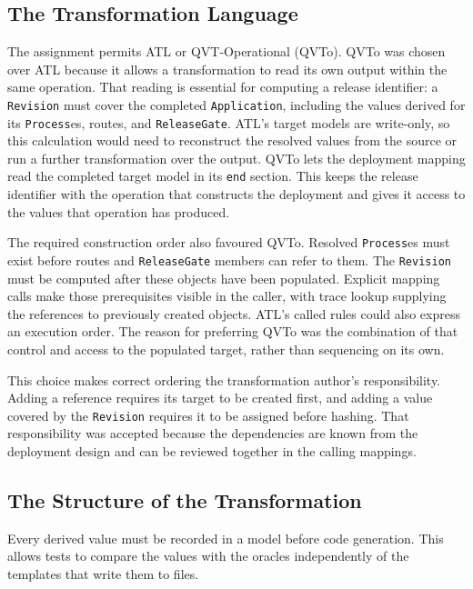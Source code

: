 \subsection{The Transformation Language}
\label{sec:language}

The assignment permits ATL or QVT-Operational (QVTo). QVTo was chosen over ATL because it allows a transformation to read its own output within the same operation. That reading is essential for computing a release identifier: a \texttt{Revision} must cover the completed \texttt{Application}, including the values derived for its \texttt{Process}es, routes, and \texttt{ReleaseGate}. ATL's target models are write-only, so this calculation would need to reconstruct the resolved values from the source or run a further transformation over the output.
QVTo lets the deployment mapping read the completed target model in its
\texttt{end} section. This keeps the release identifier with the operation
that constructs the deployment and gives it access to the values that
operation has produced.

The required construction order also favoured QVTo. Resolved
\texttt{Process}es must exist before routes and \texttt{ReleaseGate}
members can refer to them. The \texttt{Revision} must be computed after
these objects have been populated. Explicit mapping calls make those
prerequisites visible in the caller, with trace lookup supplying the
references to previously created objects. ATL's called rules could also
express an execution order. The reason for preferring QVTo was the
combination of that control and access to the populated target, rather
than sequencing on its own.

This choice makes correct ordering the transformation author's
responsibility. Adding a reference requires its target to be created
first, and adding a value covered by the \texttt{Revision} requires it to
be assigned before hashing. That responsibility was accepted because the
dependencies are known from the deployment design and can be reviewed
together in the calling mappings.

\subsection{The Structure of the Transformation}
\label{sec:structure}

Every derived value must be recorded in a model before code generation.
This allows tests to compare the values with the oracles independently of
the templates that write them to files.

